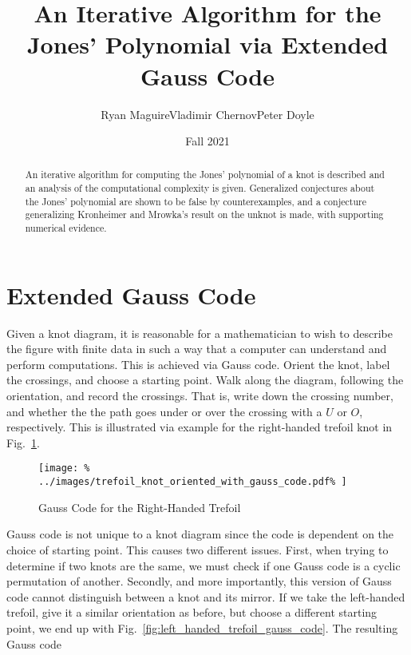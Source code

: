 \documentclass{article}
\title{An Iterative Algorithm for the Jones' Polynomial via Extended Gauss Code}
\author{Ryan Maguire\hspace{2em}Vladimir Chernov\hspace{2em}Peter Doyle}
\date{Fall 2021}
\theoremstyle{plain}
\begin{document}
    \maketitle
    \tableofcontents
    \begin{abstract}
        \noindent
        An iterative algorithm for computing the Jones' polynomial of a knot
        is described and an analysis of the computational complexity is given.
        Generalized conjectures about the Jones' polynomial are shown to be
        false by counterexamples, and a conjecture generalizing Kronheimer and
        Mrowka's result on the unknot is made, with supporting numerical
        evidence.
    \end{abstract}
    \section{Extended Gauss Code}
        Given a knot diagram, it is reasonable for a mathematician to wish to
        describe the figure with finite data in such a way that a computer can
        understand and perform computations. This is achieved via Gauss code.
        Orient the knot, label the crossings, and choose a starting point.
        Walk along the diagram, following the orientation, and record the
        crossings. That is, write down the crossing number, and whether the
        the path goes under or over the crossing with a $U$ or $O$,
        respectively. This is illustrated via example for the right-handed
        trefoil knot in Fig.~\ref{fig:right_handed_trefoil_gauss_code}.
        \begin{figure}
            \centering
            \texttt{[image: \%
                ../images/trefoil\_knot\_oriented\_with\_gauss\_code.pdf\%
            ]}
            \caption{Gauss Code for the Right-Handed Trefoil}
            \label{fig:right_handed_trefoil_gauss_code}
        \end{figure}
        Gauss code is not unique to a knot diagram since the code is dependent
        on the choice of starting point. This causes two different issues.
        First, when trying to determine if two knots are the same, we must
        check if one Gauss code is a cyclic permutation of another. Secondly,
        and more importantly, this version of Gauss code cannot distinguish
        between a knot and its mirror. If we take the left-handed trefoil,
        give it a similar orientation as before, but choose a different
        starting point, we end up with
        Fig.~\ref{fig:left_handed_trefoil_gauss_code}. The resulting Gauss code
\end{document}
